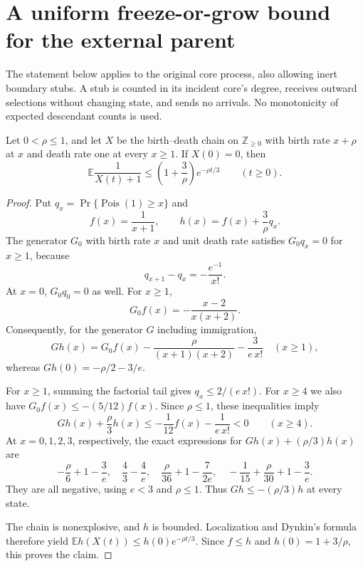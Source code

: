 \section{A uniform freeze-or-grow bound for the external parent}
\label{ps:section}

The statement below applies to the original core process, also allowing
inert boundary stubs.  A stub is counted in its incident core's degree,
receives outward selections without changing state, and sends no arrivals.
No monotonicity of expected descendant counts is used.

\begin{lemma}
\label{ps:reciprocal}
Let $0<\rho\le1$, and let $X$ be the birth--death chain on
$\mathbb Z_{\ge0}$ with birth rate $x+\rho$ at $x$ and death rate one
at every $x\ge1$.  If $X(0)=0$, then
\begin{equation}\label{ps:reciprocal-bound}
 \mathbb E\frac1{X(t)+1}
 \le \left(1+\frac3\rho\right)e^{-\rho t/3}
 \qquad(t\ge0).
\end{equation}
\end{lemma}
\begin{proof}
Put $q_x=\Pr\{\operatorname{Pois}(1)\ge x\}$ and
\[
 f(x)=\frac1{x+1},\qquad
 h(x)=f(x)+\frac3\rho q_x.
\]
The generator $G_0$ with birth rate $x$ and unit death rate satisfies
$G_0q_x=0$ for $x\ge1$, because
\[
 q_{x+1}-q_x=-\frac{e^{-1}}{x!}.
\]
At $x=0$, $G_0q_0=0$ as well.  For $x\ge1$,
\[
 G_0f(x)=-\frac{x-2}{x(x+2)}.
\]
Consequently, for the generator $G$ including immigration,
\[
 Gh(x)=G_0f(x)
       -\frac{\rho}{(x+1)(x+2)}-\frac3{e\,x!}
 \quad(x\ge1),
\]
whereas $Gh(0)=-\rho/2-3/e$.

For $x\ge1$, summing the factorial tail gives
$q_x\le2/(e\,x!)$.  For $x\ge4$ we also have
$G_0f(x)\le-(5/12)f(x)$.  Since $\rho\le1$, these inequalities imply
\[
 Gh(x)+\frac\rho3 h(x)
 \le-\frac1{12}f(x)-\frac1{e\,x!}<0
 \qquad(x\ge4).
\]
At $x=0,1,2,3$, respectively, the exact expressions for
$Gh(x)+(\rho/3)h(x)$ are
\[
 -\frac\rho6+1-\frac3e,\quad
 \frac43-\frac4e,\quad
 \frac\rho{36}+1-\frac7{2e},\quad
 -\frac1{15}+\frac\rho{30}+1-\frac3e.
\]
They are all negative, using $e<3$ and $\rho\le1$.
Thus $Gh\le-(\rho/3)h$ at every state.

The chain is nonexplosive, and $h$ is bounded.  Localization and
Dynkin's formula therefore yield
$\mathbb E h(X(t))\le h(0)e^{-\rho t/3}$.
Since $f\le h$ and $h(0)=1+3/\rho$, this proves the claim.
\end{proof}

